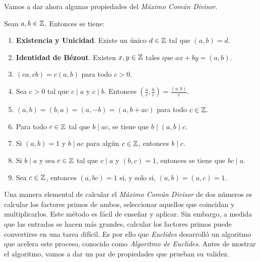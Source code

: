 Vamos a dar ahora algunas propiedades del \textit{Máximo Común Divisor}.

\begin{proposicion}\label{propiedades_maximo_comun_divisor}
	Sean $a, b \in \mathbb{Z}$. Entonces se tiene:
	
	\begin{enumerate}
		\item \textbf{Existencia y Unicidad}. Existe un único $d \in \mathbb{Z}$ tal que $(a, b) = d$.
		
		\item \textbf{Identidad de Bézout}. Existen $x, y \in \mathbb{Z}$ tales que $ax + by = (a, b)$.
		
		\item $(ca, cb) = c(a, b)$ para todo $c > 0$.
		
		\item Sea $c > 0$ tal que $c \mid a$ y $c \mid b$. Entonces $\left(\frac{a}{c}, \frac{b}{c}\right) = \frac{(a, b)}{c}$.
		
		\item $(a, b) = (b, a) = (a, -b) = (a, b + ac)$ para todo $c \in \mathbb{Z}$.
		
		\item Para todo $c \in \mathbb{Z}$ tal que $b \mid ac$, se tiene que $b \mid (a, b)c$.
		
		\item Si $(a, b) = 1$ y $b \mid ac$ para algún $c \in \mathbb{Z}$, entonces $b \mid c$.
		
		\item Si $b \mid a$ y sea $c \in \mathbb{Z}$ tal que $c \mid a$ y $(b, c) = 1$, entonces se tiene que $bc \mid a$.
		
		\item Sea $c \in \mathbb{Z}$, entonces $(a, bc) = 1$ si, y solo si, $(a, b) = (a, c) = 1$.
	\end{enumerate}
\end{proposicion}

Una manera elemental de calcular el \textit{Máximo Común Divisor} de dos números es calcular los factores primos de ambos, seleccionar aquellos que coincidan y multiplicarlos. Este método es fácil de enseñar y aplicar. Sin embargo, a medida que las entradas se hacen más grandes, calcular los factores primos puede convertirse en una tarea difícil. Es por ello que \textit{Euclides} desarrolló un algoritmo que acelera este proceso, conocido como \textit{Algoritmo de Euclides}. Antes de mostrar el algoritmo, vamos a dar un par de propiedades que prueban su validez.


